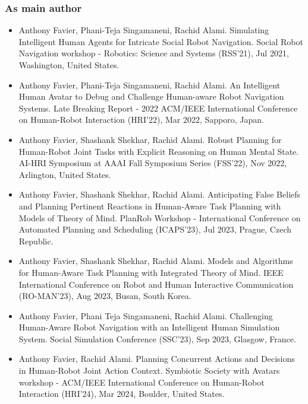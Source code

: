 \subsubsection*{As main author}
\begin{itemize}

    \item Anthony Favier, Phani-Teja Singamaneni, Rachid Alami. Simulating Intelligent Human Agents for Intricate Social Robot Navigation. Social Robot Navigation workshop - Robotics: Science and Systems (RSS'21), Jul 2021, Washington, United States. 
    \item Anthony Favier, Phani-Teja Singamaneni, Rachid Alami. An Intelligent Human Avatar to Debug and Challenge Human-aware Robot Navigation Systems. Late Breaking Report - 2022 ACM/IEEE International Conference on Human-Robot Interaction (HRI'22), Mar 2022, Sapporo, Japan. 
    \item Anthony Favier, Shashank Shekhar, Rachid Alami. Robust Planning for Human-Robot Joint Tasks with Explicit Reasoning on Human Mental State. AI-HRI Symposium at AAAI Fall Symposium Series (FSS'22), Nov 2022, Arlington, United States. 
    \item Anthony Favier, Shashank Shekhar, Rachid Alami. Anticipating False Beliefs and Planning Pertinent Reactions in Human-Aware Task Planning with Models of Theory of Mind. PlanRob Workshop - International Conference on Automated Planning and Scheduling (ICAPS'23), Jul 2023, Prague, Czech Republic. 
    \item Anthony Favier, Shashank Shekhar, Rachid Alami. Models and Algorithms for Human-Aware Task Planning with Integrated Theory of Mind. IEEE International Conference on Robot and Human Interactive Communication (RO-MAN'23), Aug 2023, Busan, South Korea. 
    \item Anthony Favier, Phani Teja Singamaneni, Rachid Alami. Challenging Human-Aware Robot Navigation with an Intelligent Human Simulation System. Social Simulation Conference (SSC'23), Sep 2023, Glasgow, France. 
    \item Anthony Favier, Rachid Alami. Planning Concurrent Actions and Decisions in Human-Robot Joint Action Context. Symbiotic Society with Avatars workshop - ACM/IEEE International Conference on Human-Robot Interaction (HRI'24), Mar 2024, Boulder, United States.

\end{itemize}
    
